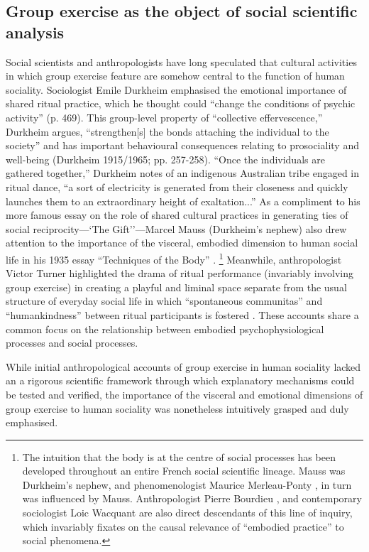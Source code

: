 \begin{CJK}{UTF8}{gbsn}
\subsection{Group exercise as the object of social scientific analysis\label{sect:GEsoSci}}
Social scientists and anthropologists have long speculated that cultural activities in which group exercise feature are somehow central to the function of human sociality.  Sociologist Emile Durkheim emphasised the emotional importance of shared ritual practice, which he thought could ``change the conditions of psychic activity'' (p. 469).  This group-level property of ``collective effervescence,'' Durkheim argues, ``strengthen[s] the bonds attaching the individual to the society'' and has important behavioural consequences relating to prosociality and well-being (Durkheim 1915/1965; pp. 257-258). ``Once the individuals are gathered together,'' Durkheim notes of an indigenous Australian tribe engaged in ritual dance, ``a sort of electricity is generated from their closeness and quickly launches them to an extraordinary height of exaltation...''  As a compliment to his more famous essay on the role of shared cultural practices in generating ties of social reciprocity---`The Gift''---Marcel Mauss (Durkheim's nephew) also drew attention to the importance of the visceral, embodied dimension to human social life in his 1935 essay ``Techniques of the Body'' \citep{Mauss1935}.
    \footnote{The intuition that the body is at the centre of social processes has been developed throughout an entire French social scientific lineage.  Mauss was Durkheim's nephew, and phenomenologist Maurice Merleau-Ponty \citep{Merleau-Ponty1956}, in turn was influenced by Mauss.  Anthropologist Pierre Bourdieu \citep{Bourdieu1990}, and contemporary sociologist Loic Wacquant \citep{Wacquant2004} are also direct descendants of this line of inquiry, which invariably fixates on the causal relevance of ``embodied practice'' to social phenomena.}
Meanwhile, anthropologist Victor Turner highlighted the drama of ritual performance (invariably involving group exercise) in creating a playful and liminal space separate from the usual structure of everyday social life in which ``spontaneous communitas'' and ``humankindness'' between ritual participants is fostered \citep{Turner1974}.  These accounts share a common focus on the relationship between embodied psychophysiological processes and social processes.

While initial anthropological accounts of group exercise in human sociality lacked an a rigorous scientific framework through which explanatory mechanisms could be tested and verified, the importance of the visceral and emotional dimensions of group exercise to human sociality was nonetheless intuitively grasped and duly emphasised.


\end{CJK}
